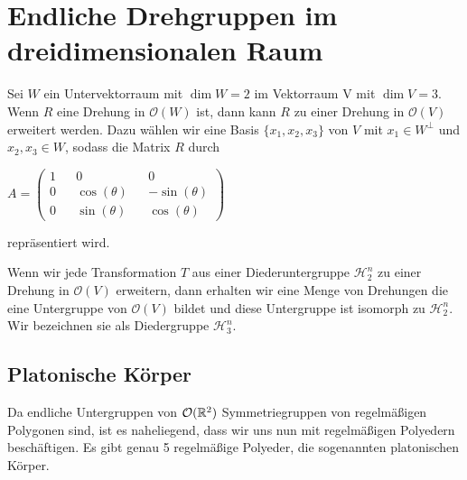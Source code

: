 \section{Endliche Drehgruppen im dreidimensionalen Raum}
\begin{bem}
 Sei $W$ ein Untervektorraum mit $\dim W = 2$ im Vektorraum V mit $\dim V = 3$. Wenn $R$ eine Drehung in $\mathcal{O}(W)$ ist, dann kann $R$ zu einer Drehung in $\mathcal{O}(V)$ erweitert werden. Dazu wählen wir eine Basis $\{x_1,x_2,x_3\}$ von $V$ mit $x_1 \in W^{\perp}$ und $x_2,x_3 \in W$, sodass die Matrix $R$ durch \begin{center}
                                                                                                                                                                                                                                                                                                                                 $A=\begin{pmatrix}                                                                                                                                                                                                                                                                                                                                     
   1 && 0 && 0 \\
   0 && \cos(\theta) && -\sin(\theta) \\
   0 && \sin(\theta) && \cos(\theta)
   \end{pmatrix}
$                                                                                                                                                                                                                                                                                                                         \end{center}
repräsentiert wird.
\end{bem}
\begin{bem}
 Wenn wir jede Transformation $T$ aus einer Diederuntergruppe $\mathcal{H}^n_2$ zu einer Drehung in $\mathcal{O}(V)$ erweitern, dann erhalten wir eine Menge von Drehungen die eine Untergruppe von $\mathcal{O}(V)$ bildet und diese Untergruppe ist isomorph zu $\mathcal{H}^n_2$. Wir bezeichnen sie als Diedergruppe $\mathcal{H}^n_3$.
\end{bem}
\subsection{Platonische Körper}
 Da endliche Untergruppen von ${\mathcal{O}(\mathbb{R}^2)}$ Symmetriegruppen von regelmäßigen Polygonen sind, ist es naheliegend, dass wir uns nun mit regelmäßigen Polyedern beschäftigen. Es gibt genau 5 regelmäßige Polyeder, die sogenannten platonischen Körper. 
 
